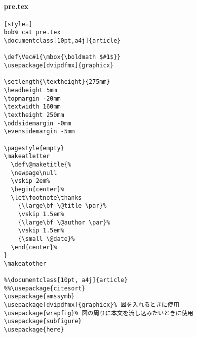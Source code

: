 \paragraph{pre.tex}\begin{lstlisting}[style=]
bob% cat pre.tex
\documentclass[10pt,a4j]{article}

\def\Vec#1{\mbox{\boldmath $#1$}}
\usepackage[dvipdfmx]{graphicx}

\setlength{\textheight}{275mm}
\headheight 5mm
\topmargin -20mm
\textwidth 160mm
\textheight 250mm
\oddsidemargin -0mm
\evensidemargin -5mm

\pagestyle{empty}
\makeatletter
  \def\@maketitle{%
  \newpage\null
  \vskip 2em%
  \begin{center}%
  \let\footnote\thanks
    {\large\bf \@title \par}%
    \vskip 1.5em%
    {\large\bf \@author \par}%
    \vskip 1.5em%
    {\small \@date}%
  \end{center}%
}
\makeatother

%\documentclass[10pt, a4j]{article}
%%\usepackage{citesort}
\usepackage{amssymb}
\usepackage[dvipdfmx]{graphicx}% 図を入れるときに使用
\usepackage{wrapfig}% 図の周りに本文を流し込みたいときに使用
\usepackage{subfigure}
\usepackage{here}
\end{lstlisting}
